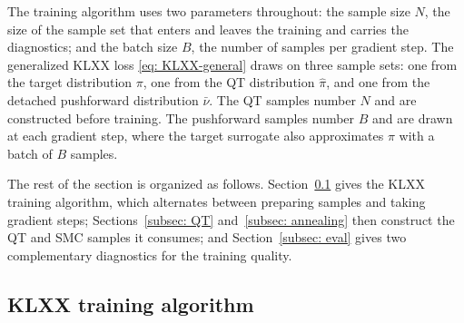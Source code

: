\documentclass{article}
\begin{document}
The training algorithm uses two parameters throughout: the sample size $N$, the size of the sample set that enters and leaves the training and carries the diagnostics; and the batch size $B$, the number of samples per gradient step.
The generalized KLXX loss \eqref{eq: KLXX-general} draws on three sample sets: one from the target distribution $\pi$, one from the QT distribution $\hat\pi$, and one from the detached pushforward distribution $\bar\nu$. The QT samples number $N$ and are constructed before training. The pushforward samples number $B$ and are drawn at each gradient step, where the target surrogate also approximates $\pi$ with a batch of $B$ samples.

The rest of the section is organized as follows. Section~\ref{subsec: training-algorithm} gives the KLXX training algorithm, which alternates between preparing samples and taking gradient steps; Sections~\ref{subsec: QT} and~\ref{subsec: annealing} then construct the QT and SMC samples it consumes; and Section~\ref{subsec: eval} gives two complementary diagnostics for the training quality.

\subsection{KLXX training algorithm}
\label{subsec: training-algorithm}
\end{document}
